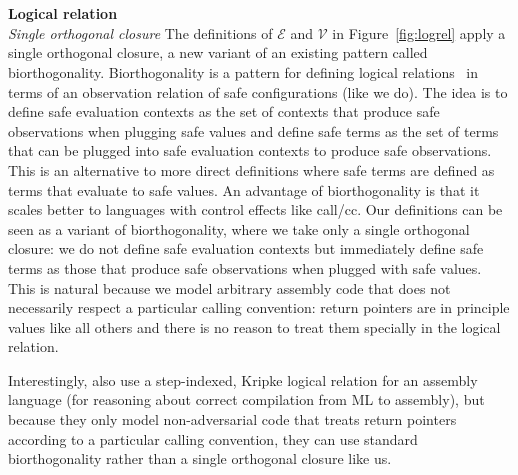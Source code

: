 \documentclass[format=acmsmall, review=true, screen=true]{acmart}
\renewcommand{\figurename}{Figure}
\newcommand{\asmType}{\plaindom{AsmType}}
\newcommand{\plaindom}[1]{\mathrm{#1}}
\newcommand{\intr}[2]{\mathcal{#1}}
\newcommand{\valueintr}[1]{\intr{V}{#1}}
\newcommand{\exprintr}[1]{\intr{E}{#1}}
\newcommand{\stdvr}{\valueintr{\asmType}}
\newcommand{\stder}{\exprintr{\asmType}}
\begin{document}
\\\\
\noindent\textbf{Logical relation}\\
\emph{Single orthogonal closure} The definitions of $\stder$ and $\stdvr$ in
\figurename~\ref{fig:logrel} apply a single orthogonal closure, a new variant of an
existing pattern called biorthogonality. Biorthogonality is a pattern for
defining logical relations~\citep{krivine_classical_1994,pitts_operational_1998}
in terms of an observation relation of safe configurations (like we do). The
idea is to define safe evaluation contexts as the set of contexts that produce
safe observations when plugging safe values and define safe terms as the set of
terms that can be plugged into safe evaluation contexts to produce safe
observations. This is an alternative to more direct definitions where safe terms
are defined as terms that evaluate to safe values. An advantage of
biorthogonality is that it scales better to languages with control effects like
call/cc. Our definitions can be seen as a variant of biorthogonality, where we
take only a single orthogonal closure: we do not define safe evaluation contexts
but immediately define safe terms as those that produce safe observations when
plugged with safe values. This is natural because we model arbitrary assembly
code that does not necessarily respect a particular calling convention: return
pointers are in principle values like all others and there is no reason to treat
them specially in the logical relation.

Interestingly, \citet{Hur:2011:KLR:1926385.1926402} also use a step-indexed,
Kripke logical relation for an assembly language (for reasoning about correct
compilation from ML to assembly), but because they only model non-adversarial
code that treats return pointers according to a particular calling convention,
they can use standard biorthogonality rather than a single orthogonal closure
like us.
\end{document}
